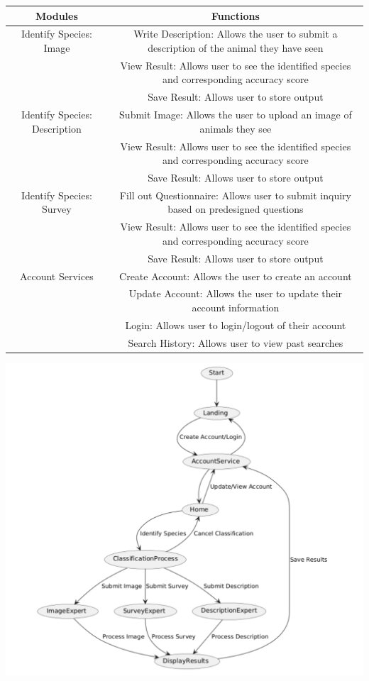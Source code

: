 \documentclass[]{article}
\begin{document}
\begin{center}
	\begin{tabular}{ |c|c| } 
	\hline
	Modules & Functions \\
	\hline
	Identify Species: Image 
	& Write Description: Allows the user to submit a description of the animal they have seen \\ 
	& View Result: Allows user to see the identified species and corresponding accuracy score \\
	& Save Result: Allows user to store output \\
   \hline
   Identify Species: Description & Submit Image: Allows the user to upload an image of animals they see \\ 
   & View Result: Allows user to see the identified species and corresponding accuracy score \\
   & Save Result: Allows user to store output \\
  \hline	
  \hline
  Identify Species: Survey 
  & Fill out Questionnaire: Allows user to submit inquiry based on predesigned questions \\ 
  & View Result: Allows user to see the identified species and corresponding accuracy score \\
  & Save Result: Allows user to store output \\
 \hline	
  Account Services & Create Account: Allows the user to create an account\\ 
  & Update Account: Allows the user to update their account information \\ 
  & Login: Allows user to login/logout of their account  \\ 
  & Search History: Allows user to view past searches\\
 \hline
   \end{tabular}
\end{center}

\includegraphics[scale=0.50]{2.2StateDiagram.png}
\end{document}
